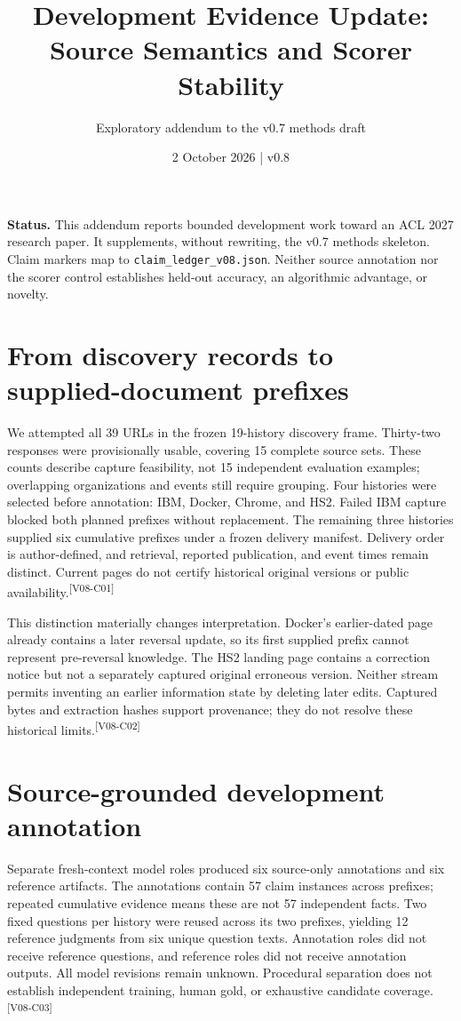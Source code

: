 \documentclass[10pt,letterpaper]{article}
\title{Development Evidence Update: Source Semantics and Scorer Stability}
\author{Exploratory addendum to the v0.7 methods draft}
\date{2 October 2026 \quad | \quad v0.8}
\newcommand{\claim}[1]{\textsuperscript{\scriptsize[#1]}}
\begin{document}
\maketitle

\noindent\textbf{Status.} This addendum reports bounded development work toward
an ACL 2027 research paper. It supplements, without rewriting, the v0.7 methods
skeleton. Claim markers map to \texttt{claim\_ledger\_v08.json}. Neither source
annotation nor the scorer control establishes held-out accuracy, an algorithmic
advantage, or novelty.

\section{From discovery records to supplied-document prefixes}
\label{sec:capture}
We attempted all 39 URLs in the frozen 19-history discovery frame. Thirty-two
responses were provisionally usable, covering 15 complete source sets. These
counts describe capture feasibility, not 15 independent evaluation examples;
overlapping organizations and events still require grouping. Four histories
were selected before annotation: IBM, Docker, Chrome, and HS2. Failed IBM
capture blocked both planned prefixes without replacement. The remaining three
histories supplied six cumulative prefixes under a frozen delivery manifest.
Delivery order is author-defined, and retrieval, reported publication, and
event times remain distinct. Current pages do not certify historical original
versions or public availability.\claim{V08-C01}

This distinction materially changes interpretation. Docker's earlier-dated
page already contains a later reversal update, so its first supplied prefix
cannot represent pre-reversal knowledge. The HS2 landing page contains a
correction notice but not a separately captured original erroneous version.
Neither stream permits inventing an earlier information state by deleting
later edits. Captured bytes and extraction hashes support provenance; they do
not resolve these historical limits.\claim{V08-C02}

\section{Source-grounded development annotation}
\label{sec:annotation}
Separate fresh-context model roles produced six source-only annotations and
six reference artifacts. The annotations contain 57 claim instances across
prefixes; repeated cumulative evidence means these are not 57 independent
facts. Two fixed questions per history were reused across its two prefixes,
yielding 12 reference judgments from six unique question texts. Annotation
roles did not receive reference questions, and reference roles did not receive
annotation outputs. All model revisions remain unknown. Procedural separation
does not establish independent training, human gold, or exhaustive candidate
coverage.\claim{V08-C03}
\end{document}
